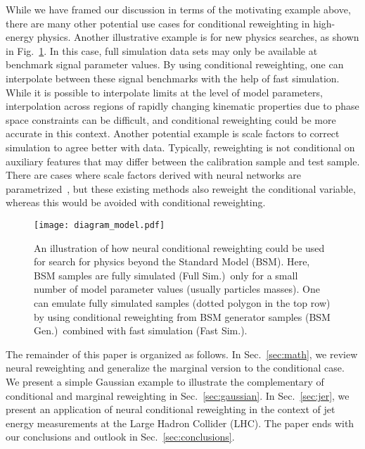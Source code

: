 \documentclass[aps,prx,reprint,preprintnumbers,superscriptaddress,nofootinbib,longbibliography,floatfix]{revtex4-2}
\DeclareRobustCommand{\Sec}[1]{Sec.~\ref{sec:#1}}
\DeclareRobustCommand{\Fig}[1]{Fig.~\ref{fig:#1}}
\begin{document}
While we have framed our discussion in terms of the motivating example above, there are many other potential use cases for conditional reweighting in high-energy physics.
%
Another illustrative example is for new physics searches, as shown in \Fig{BSM}.
%
In this case, full simulation data sets may only be available at benchmark signal parameter values.
%
By using conditional reweighting, one can interpolate between these signal benchmarks with the help of fast simulation.
%
While it is possible to interpolate limits at the level of model parameters, interpolation across regions of rapidly changing kinematic properties due to phase space constraints can be difficult, and
conditional reweighting could be more accurate in this context.
%
Another potential example is scale factors to correct simulation to agree better with data.
%
Typically, reweighting is not conditional on auxiliary features that may differ between the calibration sample and test sample.
%
There are cases where scale factors derived with neural networks are parametrized~\cite{Andreassen:2020nkr}, but these existing methods also reweight the conditional variable, whereas this would be avoided with conditional reweighting.


\begin{figure}[t]
    \centering
    \texttt{[image: diagram\_model.pdf]}
    \caption{An illustration of how neural conditional reweighting could be used for search for physics beyond the Standard Model (BSM).
    Here, BSM samples are fully simulated (Full Sim.)\ only for a small number of model parameter values (usually particles masses).  One can emulate fully simulated samples (dotted polygon in the top row) by using conditional reweighting from BSM generator samples (BSM Gen.)\ combined with fast simulation (Fast Sim.).}
    \label{fig:BSM}
\end{figure}

The remainder of this paper is organized as follows.
%
In \Sec{math}, we review neural reweighting and generalize the marginal version to the conditional case.
%
We present a simple Gaussian example to illustrate the complementary of conditional and marginal reweighting in \Sec{gaussian}.
%
In \Sec{jer}, we present an application of neural conditional reweighting in the context of jet energy measurements at the Large Hadron Collider (LHC).
%
The paper ends with our conclusions and outlook in \Sec{conclusions}.

\end{document}

